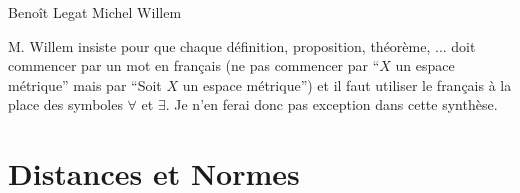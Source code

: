 

\newcommand{\sbt}{\,\begin{picture}(-1,1)(-1,-3)\circle*{2}\end{picture}\ }

\newcommand{\Le}{\mathcal{L}}
\renewcommand{\K}{\mathcal{K}}
\newcommand{\M}{\mathcal{M}}

{Benoît Legat}
{Michel Willem}

\begin{myrem}
  M. Willem insiste pour que
  chaque définition, proposition, théorème, ... doit commencer
  par un mot en français (ne pas commencer par ``$X$ un espace métrique'' mais
  par ``Soit $X$ un espace métrique'') et il faut utiliser le français à la
  place des symboles $\forall$ et $\exists$.
  Je n'en ferai donc pas exception dans cette synthèse.
\end{myrem}

\section{Distances et Normes}

